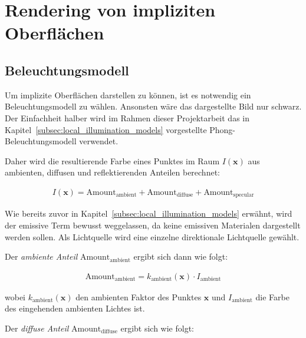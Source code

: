 
\section{Rendering von impliziten Oberflächen}
\label{sec:rendering_implicit_surfaces}

\subsection{Beleuchtungsmodell}
\label{sec:rendering_implicit_surfaces_lighting}

Um implizite Oberflächen darstellen zu können, ist es notwendig ein
Beleuchtungsmodell zu wählen. Ansonsten wäre das dargestellte Bild nur schwarz.
Der Einfachheit halber wird im Rahmen dieser Projektarbeit das in
Kapitel~\ref{subsec:local_illumination_models} vorgestellte
Phong-Beleuchtungsmodell verwendet.

Daher wird die resultierende Farbe eines Punktes im Raum $I(\bm{x})$ aus
ambienten, diffusen und reflektierenden Anteilen berechnet:

\begin{gather}
    I(\bm{x}) = \text{Amount}_{\text{ambient}} + \text{Amount}_{\text{diffuse}} + \text{Amount}_{\text{specular}}
\end{gather}

Wie bereits zuvor in Kapitel~\ref{subsec:local_illumination_models} erwähnt,
wird der emissive Term bewusst weggelassen, da keine emissiven Materialen
dargestellt werden sollen. Als Lichtquelle wird eine einzelne direktionale
Lichtquelle gewählt.

Der \textit{ambiente Anteil} $\text{Amount}_{\text{ambient}}$ ergibt sich dann wie
folgt:

\begin{gather}
    \text{Amount}_{\text{ambient}} = k_{\text{ambient}}(\bm{x}) \cdot
                              I_{\text{ambient}}
\end{gather}

wobei $k_{\text{ambient}}(\bm{x})$ den ambienten Faktor des
Punktes $\bm{x}$ und $I_{\text{ambient}}$ die Farbe des eingehenden ambienten
Lichtes ist.

Der \textit{diffuse Anteil} $\text{Amount}_{\text{diffuse}}$ ergibt sich wie folgt:

